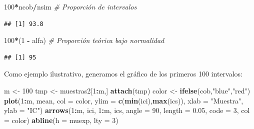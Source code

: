 \documentclass[
]{book}
\newenvironment{Shaded}{\begin{snugshade}}{\end{snugshade}}
\newcommand{\CommentTok}[1]{\textcolor[rgb]{0.56,0.35,0.01}{\textit{#1}}}
\newcommand{\DataTypeTok}[1]{\textcolor[rgb]{0.13,0.29,0.53}{#1}}
\newcommand{\DecValTok}[1]{\textcolor[rgb]{0.00,0.00,0.81}{#1}}
\newcommand{\FloatTok}[1]{\textcolor[rgb]{0.00,0.00,0.81}{#1}}
\newcommand{\KeywordTok}[1]{\textcolor[rgb]{0.13,0.29,0.53}{\textbf{#1}}}
\newcommand{\NormalTok}[1]{#1}
\newcommand{\OperatorTok}[1]{\textcolor[rgb]{0.81,0.36,0.00}{\textbf{#1}}}
\newcommand{\StringTok}[1]{\textcolor[rgb]{0.31,0.60,0.02}{#1}}
\theoremstyle{break}
\theoremstyle{definition}
\theoremstyle{definition}
\theoremstyle{definition}
\theoremstyle{remark}
\begin{document}
\begin{enumerate}
\begin{Shaded}
\begin{Highlighting}[]
\DecValTok{100}\OperatorTok{*}\NormalTok{ncob}\OperatorTok{/}\NormalTok{nsim     }\CommentTok{# Proporción de intervalos}
\end{Highlighting}
\end{Shaded}

\begin{verbatim}
## [1] 93.8
\end{verbatim}

\begin{Shaded}
\begin{Highlighting}[]
\DecValTok{100}\OperatorTok{*}\NormalTok{(}\DecValTok{1} \OperatorTok{-}\StringTok{ }\NormalTok{alfa)    }\CommentTok{# Proporción teórica bajo normalidad}
\end{Highlighting}
\end{Shaded}

\begin{verbatim}
## [1] 95
\end{verbatim}

  Como ejemplo ilustrativo, generamos el gráfico de los primeros 100 intervalos:

\begin{Shaded}
\begin{Highlighting}[]
\NormalTok{m <-}\StringTok{ }\DecValTok{100}
\NormalTok{tmp <-}\StringTok{ }\NormalTok{muestras2[}\DecValTok{1}\OperatorTok{:}\NormalTok{m,]}
\KeywordTok{attach}\NormalTok{(tmp)}
\NormalTok{color <-}\StringTok{ }\KeywordTok{ifelse}\NormalTok{(cob,}\StringTok{"blue"}\NormalTok{,}\StringTok{"red"}\NormalTok{)}
\KeywordTok{plot}\NormalTok{(}\DecValTok{1}\OperatorTok{:}\NormalTok{m, mean, }\DataTypeTok{col =}\NormalTok{ color, }\DataTypeTok{ylim =} \KeywordTok{c}\NormalTok{(}\KeywordTok{min}\NormalTok{(ici),}\KeywordTok{max}\NormalTok{(ics)), }
     \DataTypeTok{xlab =} \StringTok{"Muestra"}\NormalTok{, }\DataTypeTok{ylab =} \StringTok{"IC"}\NormalTok{)}
\KeywordTok{arrows}\NormalTok{(}\DecValTok{1}\OperatorTok{:}\NormalTok{m, ici, }\DecValTok{1}\OperatorTok{:}\NormalTok{m, ics, }\DataTypeTok{angle =} \DecValTok{90}\NormalTok{, }\DataTypeTok{length =} \FloatTok{0.05}\NormalTok{, }\DataTypeTok{code =} \DecValTok{3}\NormalTok{, }\DataTypeTok{col =}\NormalTok{ color)}
\KeywordTok{abline}\NormalTok{(}\DataTypeTok{h =}\NormalTok{ muexp, }\DataTypeTok{lty =} \DecValTok{3}\NormalTok{)}
\end{Highlighting}
\end{Shaded}


\end{enumerate}
\end{document}
